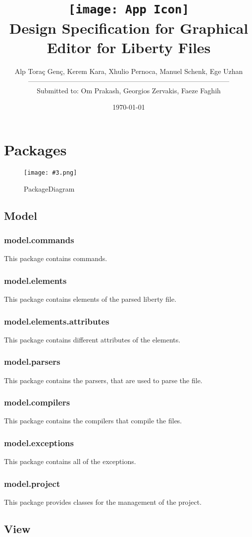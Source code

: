 \documentclass[10pt,a4paper]{report}
\title{\texttt{[image: App Icon]}\\Design Specification for Graphical Editor for Liberty Files}
\author{Alp Toraç Genç, Kerem Kara, Xhulio Pernoca, Manuel Schenk, Ege Uzhan \leavevmode \\---------------------------------------------------------------------------------------\\
Submitted to: Om Prakash, Georgios Zervakis, Faeze Faghih}
\date{\today}
\newcommand{\includeimage}[5]{
    \begin{figure}[H]
        #1
        \texttt{[image: \#3.png]}
        \caption{#4}
        \label{fig:#5}
    \end{figure}
}
\begin{document}
\maketitle
\label{sec:title}
\tableofcontents

\chapter{Packages}
    \includeimage{}{0.3}{PackageDiagram}{PackageDiagram}{PackageDiagram}
    \section{Model}
    \subsection{model.commands}
    This package contains commands.
    \subsection{model.elements}
    This package contains elements of the parsed liberty file.
    \subsection{model.elements.attributes}
    This package contains different attributes of the elements.
    \subsection{model.parsers}
    This package contains the parsers, that are used to parse the file.
    \subsection{model.compilers}
    This package contains the compilers that compile the files.
    \subsection{model.exceptions}
    This package contains all of the exceptions.
    \subsection{model.project}
    This package provides classes for the management of the project.
    \section{View}
\end{document}
